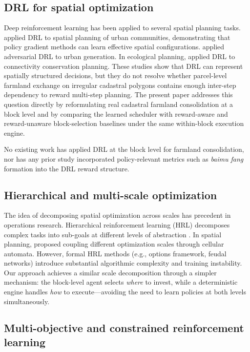 \documentclass[preprint,12pt]{elsarticle}
\begin{document}
\subsection{DRL for spatial optimization}

Deep reinforcement learning has been applied to several spatial planning tasks. \citet{zheng2023spatial} applied DRL to spatial planning of urban communities, demonstrating that policy gradient methods can learn effective spatial configurations. \citet{wang2021deep} applied adversarial DRL to urban generation. In ecological planning, \citet{equihua2024conservation} applied DRL to connectivity conservation planning. These studies show that DRL can represent spatially structured decisions, but they do not resolve whether parcel-level farmland exchange on irregular cadastral polygons contains enough inter-step dependency to reward multi-step planning. The present paper addresses this question directly by reformulating real cadastral farmland consolidation at a block level and by comparing the learned scheduler with reward-aware and reward-unaware block-selection baselines under the same within-block execution engine.

No existing work has applied DRL at the block level for farmland consolidation, nor has any prior study incorporated policy-relevant metrics such as \textit{baimu fang} formation into the DRL reward structure.

\subsection{Hierarchical and multi-scale optimization}

The idea of decomposing spatial optimization across scales has precedent in operations research. Hierarchical reinforcement learning (HRL) decomposes complex tasks into sub-goals at different levels of abstraction \citep{barto2003recent}. In spatial planning, \citet{li2011coupling} proposed coupling different optimization scales through cellular automata. However, formal HRL methods (e.g., options framework, feudal networks) introduce substantial algorithmic complexity and training instability. Our approach achieves a similar scale decomposition through a simpler mechanism: the block-level agent selects \textit{where} to invest, while a deterministic engine handles \textit{how} to execute---avoiding the need to learn policies at both levels simultaneously.

\subsection{Multi-objective and constrained reinforcement learning}
\end{document}
